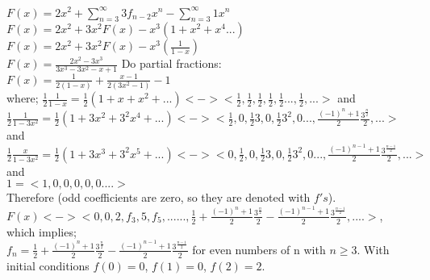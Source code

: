 \documentclass[12pt]{article}
\begin{document}
$F(x)=2x^{2}+\sum_{n=3}^{\infty}3f_{n-2}x^{n}-\sum_{n=3}^{\infty}1x^{n}$\\

$F(x)=2x^{2}+3x^{2}F(x)-x^{3}(1+x^{2}+x^{4}...)$\\

$F(x)=2x^{2}+3x^{2}F(x)-x^{3}(\frac{1}{1-x})$\\

$F(x)=\frac{2x^{2}-3x^{3}}{3x^3-3x^2-x+1}$ Do partial fractions:\\

$F(x)=\frac{1}{2(1-x)}+\frac{x-1}{2(3x^2-1)}-1$ \\

where; $\frac{1}{2}\frac{1}{1-x}=\frac{1}{2}(1+x+x^{2}+...)<-><\frac{1}{2},\frac{1}{2},\frac{1}{2},\frac{1}{2},\frac{1}{2}...,\frac{1}{2},...>$ and\\

$\frac{1}{2}\frac{1}{1-3x^{2}}=\frac{1}{2}(1+3x^{2}+3^{2}x^{4}+...)<-><\frac{1}{2},0,\frac{1}{2}3,0,\frac{1}{2}3^{2},0...,\frac{(-1)^{n}+1}{2}\frac{3^{\frac{n}{2}}}{2},...>$
and\\

$\frac{1}{2}\frac{x}{1-3x^{2}}=\frac{1}{2}(1+3x^{3}+3^{2}x^{5}+...)<-><0,\frac{1}{2},0,\frac{1}{2}3,0,\frac{1}{2}3^{2},0...,\frac{(-1)^{n-1}+1}{2}\frac{3^{\frac{n-1}{2}}}{2},...>$
and\\

$1=<1,0,0,0,0,0....>$\\


Therefore (odd coefficients are zero, so they are denoted with $f's$).\\  $F(x)<-><0,0,2,f_3,5,f_5,......,\frac{1}{2}+ \frac{(-1)^{n}+1}{2}\frac{3^{\frac{n}{2}}}{2}-\frac{(-1)^{n-1}+1}{2}\frac{3^{\frac{n-1}{2}}}{2},....>$,
which implies;\\ 

$f_{n}=\frac{1}{2}+\frac{(-1)^{n}+1}{2}\frac{3^{\frac{n}{2}}}{2}-\frac{(-1)^{n-1}+1}{2}\frac{3^{\frac{n-1}{2}}}{2}$ for even numbers of n with $n \geq 3$. With initial conditions $f(0)=0$, $f(1)=0$, $f(2)=2$.
\newpage
\end{document}
